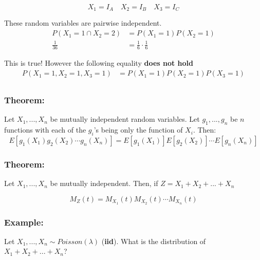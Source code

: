 \documentclass{article}
\begin{document}
\begin{equation*}
    X_1 = I_A \quad X_2 = I_B \quad X_3 = I_C
\end{equation*}

These random variables are pairwise independent. 
\begin{equation*}
    \begin{split}
        P(X_1 = 1 \cap X_2 = 2) &= P(X_1 = 1) P(X_2 = 1)\\
        \frac{1}{36} &= \frac{1}{6}\cdot \frac{1}{6}
    \end{split}
\end{equation*}

This is true! However the following equality \textbf{does not hold}
\begin{equation*}
    \begin{split}
        P(X_1=1, X_2 = 1, X_3 = 1) &= P(X_1 =1) P(X_2 = 1) P(X_3 = 1)\\
    \end{split}
\end{equation*}


\subsubsection*{Theorem:}

Let $X_1,...,X_n$ be mutually independent random variables. Let $g_1, ..., g_n$ be $n$ functions with each of the $g_i$'s being only the function of $X_i$. Then:
\begin{equation*}
    E[g_1(X_1) g_2(X_2) \cdots g_n(X_n)] = E[g_1(X_1)] E[g_2(X_2)]\cdots  E[g_n(X_n)]
\end{equation*}

\subsubsection*{Theorem:}

Let $X_1,...,X_n$ be mutually independent. Then, if $Z= X_1 + X_2 + ... + X_n$

\begin{equation*}
    M_Z(t) = M_{X_1}(t) M_{X_2}(t) \cdots M_{X_n}(t)
\end{equation*}

\subsubsection*{Example:}

Let $X_1, ..., X_n \sim Poisson(\lambda)$ (\textbf{iid}). What is the distribution of $X_1 + X_2 + ... + X_n$?
\end{document}
